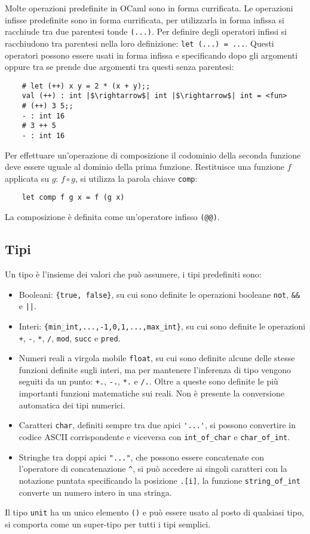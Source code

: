 \documentclass{article}
\numberwithin{equation}{subsection}
\begin{document}
Molte operazioni predefinite in OCaml sono in forma currificata. Le operazioni infisse predefinite sono in forma currificata, per utilizzarla in forma infissa si racchiude tra due parentesi tonde \verb|(...)|. Per definire degli operatori infissi si racchiudono tra parentesi nella loro definizione: \verb|let (...) = ...|. Questi operatori possono essere usati in forma infissa e specificando dopo gli argomenti oppure tra se prende due argomenti tra questi senza parentesi:
\begin{verbatim}
    # let (++) x y = 2 * (x + y);;
    val (++) : int |$\rightarrow$| int |$\rightarrow$| int = <fun>
    # (++) 3 5;;
    - : int 16
    # 3 ++ 5
    - : int 16
\end{verbatim}

Per effettuare un'operazione di composizione il codominio della seconda funzione deve essere uguale al dominio della prima funzione. Restituisce una funzione $f$ applicata su $g$: $f\circ g$, si utilizza la parola chiave \verb|comp|:
\begin{verbatim}
    let comp f g x = f (g x)
\end{verbatim}
La composizione è definita come un'operatore infisso \verb|(@@)|. 

\subsection{Tipi}

Un tipo è l'insieme dei valori che può assumere, i tipi predefiniti sono:
\begin{itemize}
    \item Booleani: \verb|{true, false}|, su cui sono definite le operazioni booleane \verb|not|, \verb|&&| e \texttt{||}. 
    \item Interi: \verb|{min_int,...,-1,0,1,...,max_int}|, su cui sono definite le operazioni \verb|+|, \verb|-|, \verb|*|, \verb|/|, \verb|mod|, \verb|succ| e \verb|pred|.
    \item Numeri reali a virgola mobile \verb|float|, su cui sono definite alcune delle stesse funzioni definite sugli interi, ma per mantenere l'inferenza di tipo vengono seguiti da un punto: \verb|+.|, \verb|-.|, \verb|*.| e \verb|/.|. Oltre a queste sono definite le più importanti funzioni matematiche sui reali. Non è presente la conversione automatica dei tipi numerici. 
    \item Caratteri \verb|char|, definiti sempre tra due apici \verb|'...'|, si possono convertire in codice ASCII corrispondente e viceversa con \verb|int_of_char| e \verb|char_of_int|. 
    \item Stringhe tra doppi apici \verb|"..."|, che possono essere concatenate con l'operatore di concatenazione \verb|^|, si può accedere ai singoli caratteri con la notazione puntata specificando la posizione \verb|.[i]|, la funzione \verb|string_of_int| converte un numero intero in una stringa. 
\end{itemize} 
Il tipo \verb|unit| ha un unico elemento \verb|()| e può essere usato al posto di qualsiasi tipo, si comporta come un super-tipo per tutti i tipi semplici.  
\end{document}
